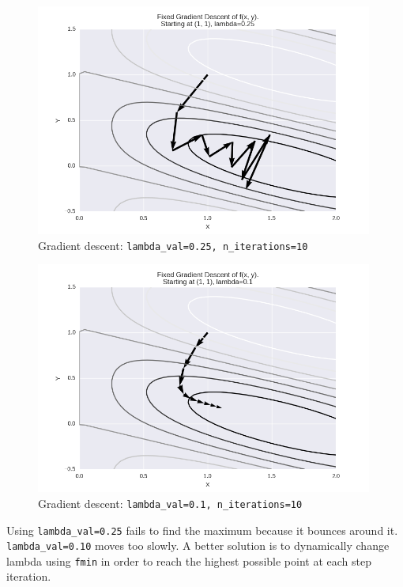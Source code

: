 \documentclass[]{article}
\begin{document}
\begin{figure}
\centering
\includegraphics[height=3in]{../img/fixed_grad_25.png}
\caption{Gradient descent: \texttt{lambda\_val=0.25, n\_iterations=10}}
\label{fig:lambda25}
\end{figure}

\begin{figure}
\centering
\includegraphics[height=3in]{../img/fixed_grad_10.png}
\caption{Gradient descent: \texttt{lambda\_val=0.1, n\_iterations=10}}
\label{fig:lambda10}
\end{figure}

Using \texttt{lambda\_val=0.25} fails to find the maximum because it bounces around it. \texttt{lambda\_val=0.10} moves too slowly. A better solution is to dynamically change lambda using \texttt{fmin} in order to reach the highest possible point at each step iteration.
\end{document}
